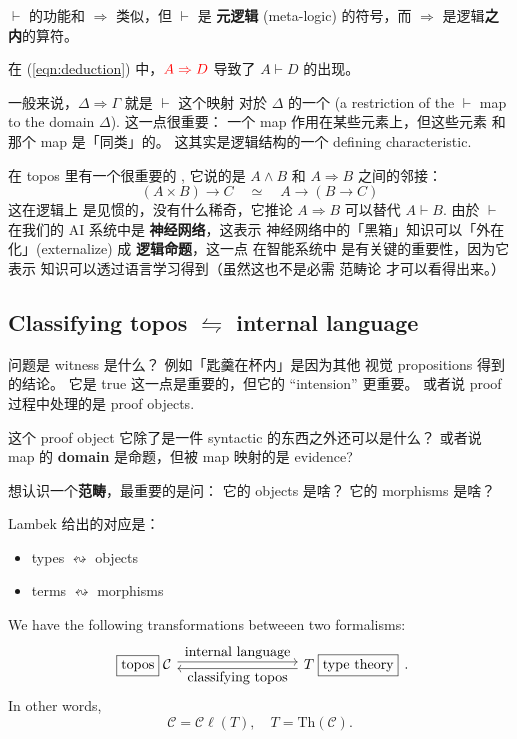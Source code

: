 $\vdash$ 的功能和 $\Rightarrow$ 类似，但 $\vdash$ 是 \textbf{元逻辑} (meta-logic) 的符号，而 $\Rightarrow$ 是逻辑\textbf{之内}的算符。

在 (\ref{eqn:deduction}) 中，${\color{red} A \Rightarrow D}$ 导致了 $A \vdash D$ 的出现。

一般来说，$\Delta \Rightarrow \Gamma$ 就是 $\vdash$ 这个映射 对於 $\Delta$ 的一个  (a restriction of the $\vdash$ map to the domain $\Delta$).  这一点很重要： 一个 map 作用在某些元素上，但这些元素 和那个 map 是「同类」的。 这其实是逻辑结构的一个 defining characteristic.

在 topos 里有一个很重要的 ,  它说的是 $A \wedge B$ 和 $A \Rightarrow B$ 之间的邻接：
\begin{equation}
(A \times B) \rightarrow C \quad \simeq \quad A \rightarrow (B \rightarrow C)
\end{equation}
这在逻辑上 是见惯的，没有什么稀奇，它推论 $A \Rightarrow B$ 可以替代 $A \vdash B$.  由於 $\vdash$ 在我们的 AI 系统中是 \textbf{神经网络}，这表示 神经网络中的「黑箱」知识可以「外在化」(externalize) 成 \textbf{逻辑命题}，这一点 在智能系统中 是有关键的重要性，因为它表示 知识可以透过语言学习得到（虽然这也不是必需 范畴论 才可以看得出来。） 

\subsection{Classifying topos $\leftrightharpoons$ internal language}

问题是 witness 是什么？  例如「匙羹在杯内」是因为其他 视觉 propositions 得到的结论。 它是 true 这一点是重要的，但它的 ``intension'' 更重要。  或者说 proof 过程中处理的是 proof objects.  

这个 proof object 它除了是一件 syntactic 的东西之外还可以是什么？  或者说 map 的 \textbf{domain} 是命题，但被 map 映射的是 evidence?

想认识一个\textbf{范畴}，最重要的是问： 它的 objects 是啥？ 它的 morphisms 是啥？ 

Lambek 给出的对应是：
\begin{itemize}
	\item types $\leftrightsquigarrow$ objects
	\item terms $\leftrightsquigarrow$ morphisms
\end{itemize}

We have the following transformations betweeen two formalisms:
\begin{equation}
\begin{tikzcd}[column sep = 20ex]
\boxed{\mbox{topos}} \; \mathcal{C}
\arrow[r, shift left, "\mbox{internal language}"]
& T \; \boxed{\mbox{type theory}}
\arrow[l, shift left, "\mbox{classifying topos}"]
\end{tikzcd}.
\end{equation}
In other words,
\begin{equation}
\mathcal{C} = \mathcal{C}\ell(T), \quad T = \mathrm{Th}(\mathcal{C}).
\end{equation}

